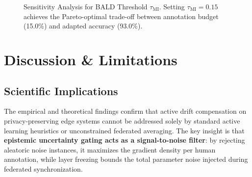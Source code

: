 \documentclass[conference]{IEEEtran}
\begin{document}
\begin{figure}[htbp]
\centering
{}
\caption{Sensitivity Analysis for BALD Threshold $\tau_{\mathrm{MI}}$. Setting $\tau_{\mathrm{MI}} = 0.15$ achieves the Pareto-optimal trade-off between annotation budget (15.0\%) and adapted accuracy (93.0\%).}
\label{fig:mi_ablation}
\end{figure}

\section{Discussion \& Limitations}

\subsection{Scientific Implications}
The empirical and theoretical findings confirm that active drift compensation on privacy-preserving edge systems cannot be addressed solely by standard active learning heuristics or unconstrained federated averaging. The key insight is that \textbf{epistemic uncertainty gating acts as a signal-to-noise filter}: by rejecting aleatoric noise instances, it maximizes the gradient density per human annotation, while layer freezing bounds the total parameter noise injected during federated synchronization.
\end{document}
